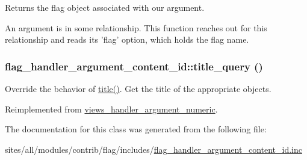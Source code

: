 Returns the flag object associated with our argument.

An argument is in some relationship. This function reaches out for this relationship and reads its 'flag' option, which holds the flag name. \hypertarget{classflag__handler__argument__content__id_d4164484998d7e2eff1a1cb233189384}{
\subsubsection[{title\_\-query}]{\setlength{\rightskip}{0pt plus 5cm}flag\_\-handler\_\-argument\_\-content\_\-id::title\_\-query ()}}
\label{classflag__handler__argument__content__id_d4164484998d7e2eff1a1cb233189384}


Override the behavior of \hyperlink{classviews__handler__argument__numeric_480758dbcde899b5483b091e51e2bf39}{title()}. Get the title of the appropriate objects. 

Reimplemented from \hyperlink{classviews__handler__argument__numeric_5c6f566b06bad6057e92f15d82311c7b}{views\_\-handler\_\-argument\_\-numeric}.

The documentation for this class was generated from the following file:\begin{CompactItemize}
\item 
sites/all/modules/contrib/flag/includes/\hyperlink{flag__handler__argument__content__id_8inc}{flag\_\-handler\_\-argument\_\-content\_\-id.inc}\end{CompactItemize}
